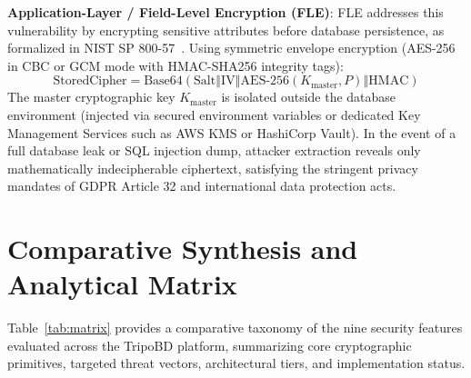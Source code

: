\documentclass[10pt,twocolumn,a4paper]{article}
\begin{document}
\noindent\textbf{Application-Layer / Field-Level Encryption (FLE)}: FLE addresses this vulnerability by encrypting sensitive attributes before database persistence, as formalized in NIST SP 800-57~\cite{nist_sp800_57}. Using symmetric envelope encryption (AES-256 in CBC or GCM mode with HMAC-SHA256 integrity tags):
\begin{equation}
\text{StoredCipher} = \text{Base64}(\text{Salt} \mathbin{\Vert} \text{IV} \mathbin{\Vert} \text{AES-256}(K_{\text{master}}, P) \mathbin{\Vert} \text{HMAC})
\end{equation}
The master cryptographic key $K_{\text{master}}$ is isolated outside the database environment (injected via secured environment variables or dedicated Key Management Services such as AWS KMS or HashiCorp Vault). In the event of a full database leak or SQL injection dump, attacker extraction reveals only mathematically indecipherable ciphertext, satisfying the stringent privacy mandates of GDPR Article 32 and international data protection acts.

\section{Comparative Synthesis and Analytical Matrix}
Table~\ref{tab:matrix} provides a comparative taxonomy of the nine security features evaluated across the TripoBD platform, summarizing core cryptographic primitives, targeted threat vectors, architectural tiers, and implementation status.
\end{document}
